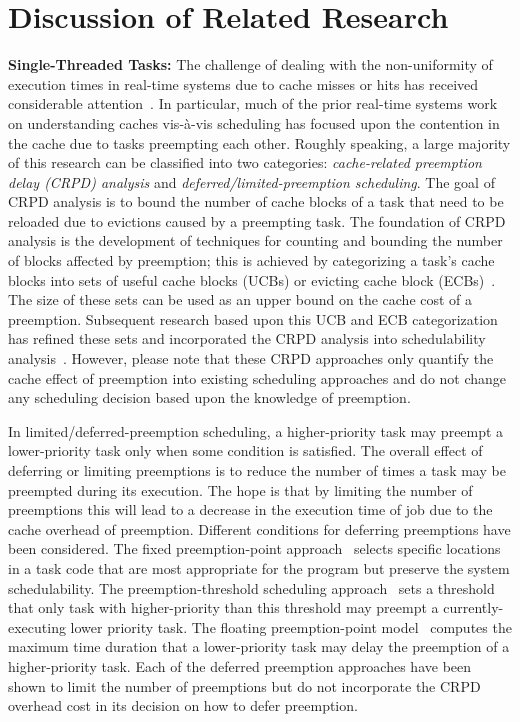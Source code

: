 \section{Discussion of Related Research}
\label{sec:related}

\noindent
{\bf Single-Threaded Tasks:}  The challenge of dealing with the
non-uniformity of execution times in real-time systems due to cache
misses or hits has received considerable attention~\cite{Wilhelm:2008,Theiling:2000}. In
particular, much of the 
prior real-time systems work on understanding caches vis-\`{a}-vis scheduling has focused upon the contention in the
cache due to tasks preempting each other.  Roughly speaking, a large
majority of this research can be classified into two categories:
\emph{cache-related preemption delay (CRPD) analysis} and
\emph{deferred/limited-preemption scheduling}. 
The goal of CRPD analysis is to bound the number of cache blocks of a
task that need to be reloaded due to evictions caused by a preempting
task.  The foundation of CRPD analysis is the development of
techniques for counting and bounding the number of blocks affected by
preemption; this is achieved by categorizing a task's cache blocks
into sets of useful cache blocks (UCBs) or evicting cache block
(ECBs)~\cite{Lee:1998,Tomiyama:2000}.  The size of these sets can be
used as an upper bound on the cache cost of a preemption.  Subsequent
research based upon this UCB and ECB categorization has refined these
sets and incorporated the CRPD analysis into schedulability
analysis~\cite{Altmeyer:2012,Altmeyer:2011,Altmeyer:2011b,Negi:2003,
  Staschulat:2005, Tan:2004}. 
However, please note that these CRPD approaches only quantify the
cache effect of preemption into existing scheduling approaches and do not
change any scheduling decision based upon the knowledge of
preemption. 

In limited/deferred-preemption scheduling, a higher-priority task may
preempt a lower-priority task only when some condition is satisfied.
The overall effect of deferring or limiting preemptions is to reduce
the number of times a task may be preempted during its execution.  The
hope is that by limiting the number of preemptions this will lead to a
decrease in the execution time of job due to the cache overhead of
preemption.  Different conditions for deferring preemptions have been
considered.  The fixed preemption-point approach~\cite{Burns:1995}
selects specific locations in a task code that are most appropriate
for the program but preserve the system schedulability.  The
preemption-threshold scheduling approach~\cite{Wang:1999} sets a
threshold that only task with higher-priority than this threshold may
preempt a currently-executing lower priority task.  The floating
preemption-point model~\cite{Baruah:2005,Marinho:2012} computes the
maximum time duration that a lower-priority task may delay the
preemption of a higher-priority task.  Each of the deferred preemption
approaches have been shown to limit the number of preemptions but do
not incorporate the CRPD overhead cost in its decision on how to defer
preemption. 

